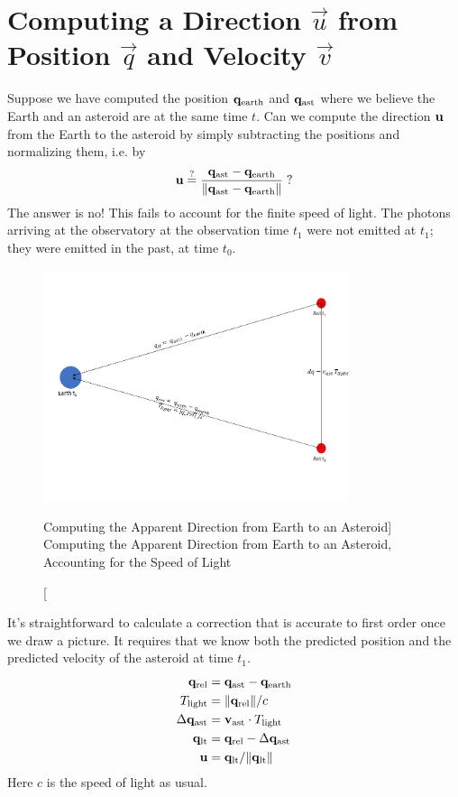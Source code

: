 \section{Computing a Direction $\vec{u}$ from Position $\vec{q}$ and Velocity $\vec{v}$}
\label{section_pos_vel_to_dir}
Suppose we have computed the position $\mathbf{q}_{\mathrm{earth}}$ and $\mathbf{q}_{\mathrm{ast}}$ where we believe the Earth and an asteroid are at the same time $t$.
Can we compute the direction $\mathbf{u}$ from the Earth to the asteroid by simply subtracting the positions and normalizing them, i.e. by
$$ \mathbf{u} \stackrel{?}{=} \frac{\mathbf{q}_{\mathrm{ast}} - \mathbf{q}_{\mathrm{earth}}}{\lVert\mathbf{q}_{\mathrm{ast}} - \mathbf{q}_{\mathrm{earth}}\rVert} \; ?$$
The answer is no! This fails to account for the finite speed of light.
The photons arriving at the observatory at the observation time $t_1$ were not emitted at $t_1$; they were emitted in the past, at time $t_0$.
\begin{figure}[hbt!]
\begin{center}
\includegraphics[width=0.8\textwidth]{../figs/misc/light_time.png}
\caption
[Computing the Apparent Direction from Earth to an Asteroid]
{Computing the Apparent Direction from Earth to an Asteroid, Accounting for the Speed of Light}
\end{center}
\end{figure}
It's straightforward to calculate a correction that is accurate to first order once we draw a picture.
It requires that we know both the predicted position and the predicted velocity of the asteroid at time $t_1$.
\begin{align*}
\mathbf{q}_{\mathrm{rel}} &= \mathbf{q}_{\mathrm{ast}} - \mathbf{q}_{\mathrm{earth}} \\
T_{\mathrm{light}} &= \lVert \mathbf{q}_{\mathrm{rel}} \rVert / c \\
\Delta \mathbf{q}_{\mathrm{ast}} &= \mathbf{v}_{\mathrm{ast}} \cdot T_{\mathrm{light}} \\
\mathbf{q}_{\mathrm{lt}} &= \mathbf{q}_{\mathrm{rel}} - \Delta \mathbf{q}_{\mathrm{ast}} \\
\mathbf{u} &= \mathbf{q}_{\mathrm{lt}} / \lVert\mathbf{q}_{\mathrm{lt}}\rVert
\end{align*}
Here $c$ is the speed of light as usual.

